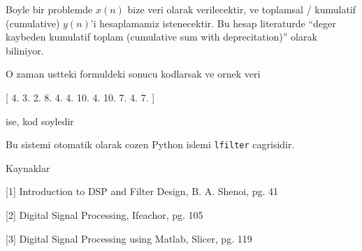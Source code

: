 \documentclass[12pt,fleqn]{article}
\begin{document}
Boyle bir problemde $x(n)$ bize veri olarak verilecektir, ve toplamsal /
kumulatif (cumulative) $y(n)$'i hesaplamamiz istenecektir. Bu hesap
literaturde ``deger kaybeden kumulatif toplam (cumulative sum with
deprecitation)'' olarak biliniyor.


O zaman ustteki formuldeki sonucu kodlarsak ve ornek veri

[  4.   3.   2.   8.   4.   4.  10.   4.  10.   7.   4.   7. ]

ise, kod soyledir



Bu sistemi otomatik olarak cozen Python islemi \verb!lfilter! cagrisidir. 



Kaynaklar

[1] Introduction to DSP and Filter Design, B. A. Shenoi, pg. 41

[2] Digital Signal Processing, Ifeachor, pg. 105

[3] Digital Signal Processing using Matlab, Slicer, pg. 119
\end{document}
